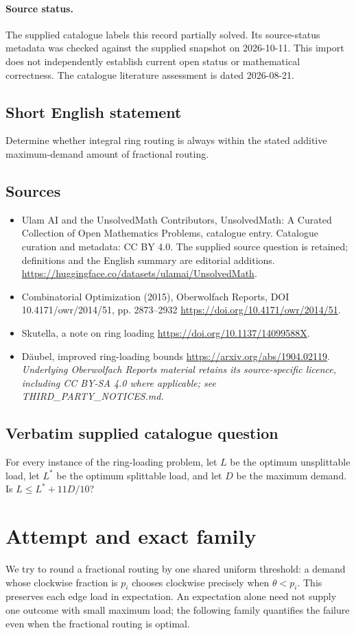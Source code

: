 \documentclass[11pt]{article}
\begin{document}
\paragraph{Source status.}
The supplied catalogue labels this record partially solved. Its source-status metadata was checked against the supplied snapshot on 2026-10-11. This import does not independently establish current open status or mathematical correctness. The catalogue literature assessment is dated 2026-08-21.
\subsection{Short English statement}
Determine whether integral ring routing is always within the stated additive maximum-demand amount of fractional routing.
\subsection{Sources}
\begin{itemize}
\item[S1] Ulam AI and the UnsolvedMath Contributors, UnsolvedMath: A Curated Collection of Open Mathematics Problems, catalogue entry. Catalogue curation and metadata: CC BY 4.0. The supplied source question is retained; definitions and the English summary are editorial additions.
\url{https://huggingface.co/datasets/ulamai/UnsolvedMath}.
\item[S2] Combinatorial Optimization (2015), Oberwolfach Reports, DOI 10.4171/owr/2014/51, pp. 2873--2932
\url{https://doi.org/10.4171/owr/2014/51}.
\item[S3] Skutella, a note on ring loading
\url{https://doi.org/10.1137/14099588X}.
\item[S4] Däubel, improved ring-loading bounds
\url{https://arxiv.org/abs/1904.02119}.
\textit{Underlying Oberwolfach Reports material retains its source-specific licence, including CC BY-SA 4.0 where applicable; see THIRD\_PARTY\_NOTICES.md.}
\end{itemize}
\subsection{Verbatim supplied catalogue question}
For every instance of the ring-loading problem, let $L$ be the optimum unsplittable load, let $L^*$ be the optimum splittable load, and let $D$ be the maximum demand. Is $L\leq L^*+11D/10$?

\section{Attempt and exact family}
We try to round a fractional routing by one shared uniform threshold: a demand
whose clockwise fraction is $p_i$ chooses clockwise precisely when $\theta<p_i$.
This preserves each edge load in expectation. An expectation alone need not
supply one outcome with small maximum load; the following family quantifies
the failure even when the fractional routing is optimal.
\end{document}
